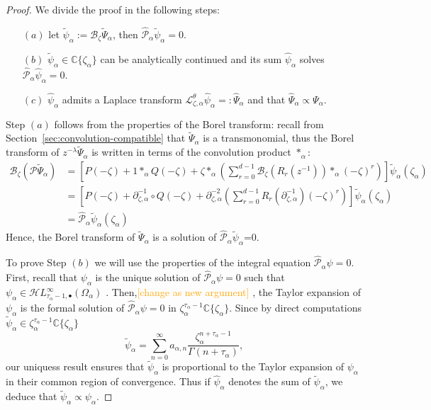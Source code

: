 \documentclass{article}
\newcommand{\singexp}[2]{\mathcal{H}L^\infty_{#1, #2}}
\newcommand{\singexpalg}[1]{\singexp{#1}{\bullet}}
\newcommand{\C}{\mathbb{C}}
\newcommand{\series}[1]{\tilde{#1}}
\newcommand{\fracderiv}[3]{\partial^{#1}_{#2, #3}}
\newcommand{\laplace}{\mathcal{L}}
\newcommand{\borel}{\mathcal{B}}
\theoremstyle{definition}
\theoremstyle{plain}
\begin{document}
\begin{proof}
We divide the proof in the following steps:
\begin{itemize}
\item[$(a)$] let $\series{\psi}_\alpha:=\borel_{\zeta}\series{\Psi}_\alpha$, then $\hat{\mathcal{P}}_\alpha\series{\psi}_\alpha=0$.
\item[$(b)$] $\tilde{\psi}_\alpha\in\C\lbrace\zeta_\alpha\rbrace$ can be analytically continued and its sum $\hat{\psi}_\alpha$ solves $\hat{\mathcal{P}}_\alpha\hat{\psi}_\alpha=0$. 
\item[$(c)$] $\hat{\psi}_\alpha$ admits a Laplace transform $\laplace_{\zeta,\alpha}^{\theta}\hat{\psi}_\alpha=:\hat{\Psi}_\alpha$ and that $\hat{\Psi}_\alpha\propto\Psi_\alpha $. 
\end{itemize}
Step $(a)$ follows from the properties of the Borel transform: recall from Section~\ref{sec:convolution-compatible} that $\tilde{\Psi}_\alpha$ is a transmonomial, thus the Borel transform of $z^{-\lambda}\tilde{\Psi}_\alpha$ is written in terms of the convolution product $\ast_{\alpha}$:   
\begin{align*}
  \borel_{\zeta}\left(\mathcal{P}\series{\Psi}_\alpha\right)&= \left[P(-\zeta)+1\ast_{\alpha} Q(-\zeta)+\zeta \ast_{\alpha} \left(\sum_{r=0}^{d-1}\borel_\zeta(R_r(z^{-1}))\ast_{\alpha}(-\zeta)^r\right)\right]\series{\psi}_\alpha(\zeta_\alpha)\\
  &=\left[P(-\zeta)+\partial_{\zeta,\alpha}^{-1}\circ Q(-\zeta)+\fracderiv{-2}{\zeta}{\alpha} \left(\sum_{r=0}^{d-1}R_r(\fracderiv{-1}{\zeta}{\alpha} )(-\zeta)^r\right)\right]\series{\psi}_\alpha(\zeta_\alpha)\\
  &=\hat{\mathcal{P}}_\alpha\tilde{\psi}_\alpha(\zeta_\alpha)
\end{align*}
Hence, the Borel transform of $\series{\Psi}_\alpha$ is a solution of $\hat{\mathcal{P}}_\alpha\series{\psi}_\alpha$=0. 

To prove Step $(b)$ we will use the properties of the integral equation $\hat{\mathcal{P}}_\alpha\psi=0$. First, recall that ${\psi}_\alpha$ is the unique solution of $\hat{\mathcal{P}}_\alpha\psi=0$ such that $\psi_\alpha\in\singexpalg{\tau_\alpha-1}(\Omega_\alpha)$ \cite[Theorem~4]{reg-sing-volterra}. Then,\textcolor{orange}{[change as new argument]} , the Taylor expansion of $\psi_\alpha$ is the formal solution of $\hat{\mathcal{P}}_\alpha\psi=0$ in $\zeta_\alpha^{\tau_\alpha-1}\C\lbrace\zeta_\alpha\rbrace$. Since by direct computations $\tilde{\psi}_\alpha\in\zeta_\alpha^{\tau_\alpha-1}\C\lbrace\zeta_\alpha\rbrace$
\[\tilde{\psi}_\alpha=\sum_{n=0}^\infty a_{\alpha,n}\frac{\zeta_\alpha^{n+\tau_\alpha-1}}{\Gamma(n+\tau_\alpha)},\]
our uniquess result ensures that $\tilde{\psi}_\alpha$ is proportional to the Taylor expansion of $\psi_\alpha$ in their common region of convergence. Thus if $\hat{\psi}_\alpha$ denotes the sum of $\tilde{\psi}_\alpha$, we deduce that $\tilde{\psi}_\alpha\propto\psi_\alpha$. 


\end{proof}
\end{document}
